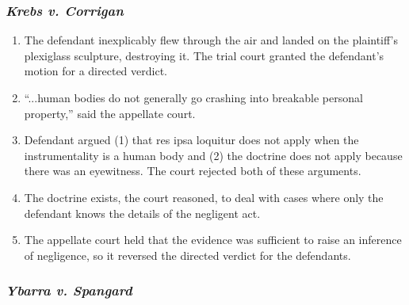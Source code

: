 \subsubsection{\emph{Krebs v. Corrigan}}

\begin{enumerate}
    \item The defendant inexplicably flew through the air and landed on the 
    plaintiff's plexiglass sculpture, destroying it. The trial court granted 
    the defendant's motion for a directed verdict.
    \item ``...human bodies do not generally go crashing into breakable 
    personal property,'' said the appellate court.
    \item Defendant argued (1) that res ipsa loquitur does not apply when the 
    instrumentality is a human body and (2) the doctrine does not apply 
    because there was an eyewitness. The court rejected both of these 
    arguments.
    \item The doctrine exists, the court reasoned, to deal with cases where 
    only the defendant knows the details of the negligent act.
    \item The appellate court held that the evidence was sufficient to raise 
    an inference of negligence, so it reversed the directed verdict for the 
    defendants.
\end{enumerate}

\subsubsection{\emph{Ybarra v. Spangard}}

